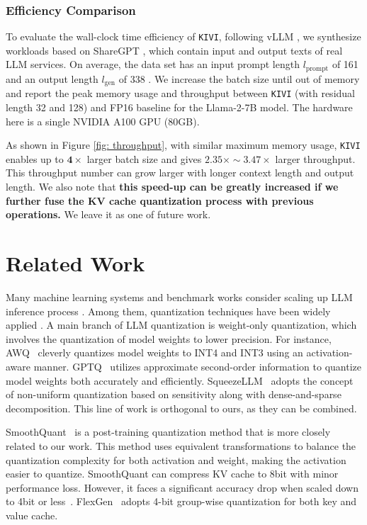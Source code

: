 \subsubsection{Efficiency Comparison}
\label{sec: efficiency}

To evaluate the wall-clock time efficiency of \texttt{KIVI},
following vLLM \citep{vllm}, we synthesize workloads based on ShareGPT \citep{shargpt}, which contain input and output texts of real LLM services. On average, the data set has an input prompt length $l_{\text{prompt}}$ of 161 and an output length $l_{\text{gen}}$ of 338 \citep{vllm}. We increase the batch size until out of memory and report the peak memory usage and throughput between \texttt{KIVI} (with residual length 32 and 128) and FP16 baseline for the Llama-2-7B model. The hardware here is a single NVIDIA A100 GPU (80GB).

As shown in Figure \ref{fig: throughput}, with similar maximum memory usage, \texttt{KIVI} enables up to $\mathbf{4\times}$ larger batch size and gives $\mathbf{2.35\times \sim 3.47\times}$ larger throughput. This throughput number can grow larger with longer context length and output length. We also note that \textbf{ this speed-up can be greatly increased if we further fuse the KV cache quantization process with previous operations.} We leave it as one of future work.

\section{Related Work}

Many machine learning systems and benchmark works consider scaling up LLM inference process \citep{pope2023efficiently, yuan2024kv}. Among them, quantization techniques have been widely applied \citep{gptq, lin2023awq, kim2023squeezellm, xu2023compress}. A main branch of LLM quantization is weight-only quantization, which involves the quantization of model weights to lower precision. For instance, AWQ~\citep{lin2023awq} cleverly quantizes model weights to INT4 and INT3 using an activation-aware manner. GPTQ~\citep{gptq} utilizes approximate second-order information to quantize model weights both accurately and efficiently. SqueezeLLM~\citep{kim2023squeezellm} adopts the concept of non-uniform quantization based on sensitivity along with dense-and-sparse decomposition. This line of work is orthogonal to ours, as they can be combined.

SmoothQuant~\citep{xiao2023smoothquant} is a post-training quantization method that is more closely related to our work. This method uses equivalent transformations to balance the quantization complexity for both activation and weight, making the activation easier to quantize. SmoothQuant can compress KV cache to 8bit with minor performance loss. However, it faces a significant accuracy drop when scaled down to 4bit or less~\citep{zhao2024atom}. FlexGen~\citep{flexgen} adopts 4-bit group-wise quantization for both key and value cache.

